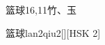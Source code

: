 \begin{entry}{篮球}{16,11}{⽵、⽟}
  \begin{phonetics}{篮球}{lan2qiu2}[][HSK 2]
  \end{phonetics}
\end{entry}
